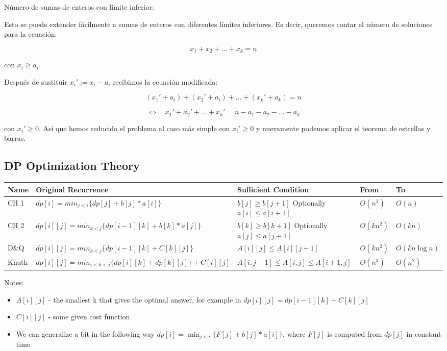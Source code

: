 Número de sumas de enteros con límite inferior:

Esto se puede extender fácilmente a sumas de enteros con diferentes límites inferiores. Es decir, queremos contar el número de soluciones para la ecuación:

\[
x_1 + x_2 + \dots + x_k = n
\]

con \(x_i \ge a_i\).

Después de sustituir \(x_i' := x_i - a_i\) recibimos la ecuación modificada:

\[
(x_1' + a_i) + (x_2' + a_i) + \dots + (x_k' + a_k) = n
\]

\[
\Leftrightarrow \quad x_1' + x_2' + \dots + x_k' = n - a_1 - a_2 - \dots - a_k
\]

con \(x_i' \ge 0\). Así que hemos reducido el problema al caso más simple con \(x_i' \ge 0\) y nuevamente podemos aplicar el teorema de estrellas y barras.

\subsection{DP Optimization Theory}
\begin{tabular}{|p{0.8cm}| p{4.5cm}| p{3.3cm}|p{0.9cm}| p{1.3cm}|}
	\hline
	Name & Original Recurrence & Sufficient Condition & From  & To  \\ 
	\hline
	CH 1 & $dp[i] = min_{j<i}\{dp[j]+b[j]*a[i ]\}$ & $b[j] \geq b[j+1]$ Optionally $a[i] \leq a[i+1]$ & $O(n^2)$ & $O(n)$ \\ 
	\hline
	CH 2 & $dp[i][j] = min_{k<j}\{dp[i-1][k] + b[k] * a[j]\}$ & $b[k] \geq b[k+1]$ Optionally $a[j] \leq a[j+1]$ & $O(kn^2)$ & $O(kn)$ \\ 
	\hline
	D\&Q & $dp[i][j] = min_{k<j}\{dp[i-1][k] + C[k][j]\}$ & $A[i][j] \leq A[i][j+1]$ & $O(kn^2)$ & $O(kn\log n)$ \\ 
	\hline
	Knuth & $dp[i][j] = min_{i<k<j} \{dp[i][k] + dp[k][j] \} + C[i][j] $ & $A[i, j -1] \leq A[i, j] \leq A[i+1, j]$ & $O(n^3)$ & $O(n^2)$ \\ 
	\hline
\end{tabular} 

Notes:

\begin{itemize}
	\item $A[i][j]$ - the smallest k that gives the optimal answer, for example in $dp[i][j] = dp[i-1][k] + C[k][j]$
	\item $C[i][j]$ - some given cost function
	\item We can generalize a bit in the following way $dp[i] = \min_{j<i}\{F[j]+b[j] * a[i]\}$, where $F[j]$ is computed from $dp[j]$ in constant time
\end{itemize}